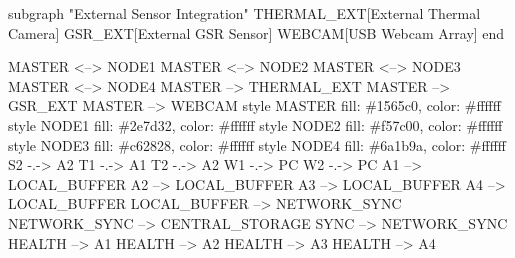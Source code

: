 \documentclass[11pt,a4paper]{report}
\begin{document}
    subgraph "External Sensor Integration"
        THERMAL\_EXT[External Thermal Camera]
        GSR\_EXT[External GSR Sensor]
        WEBCAM[USB Webcam Array]
    end

    MASTER <--> NODE1
    MASTER <--> NODE2
    MASTER <--> NODE3
    MASTER <--> NODE4
    MASTER --> THERMAL\_EXT
    MASTER --> GSR\_EXT
    MASTER --> WEBCAM
    style MASTER fill: \#1565c0, color: \#ffffff
    style NODE1 fill: \#2e7d32, color: \#ffffff
    style NODE2 fill: \#f57c00, color: \#ffffff
    style NODE3 fill: \#c62828, color: \#ffffff
    style NODE4 fill: \#6a1b9a, color: \#ffffff
    S2 -.-> A2
    T1 -.-> A1
    T2 -.-> A2
    W1 -.-> PC
    W2 -.-> PC
    A1 --> LOCAL\_BUFFER
    A2 --> LOCAL\_BUFFER
    A3 --> LOCAL\_BUFFER
    A4 --> LOCAL\_BUFFER
    LOCAL\_BUFFER --> NETWORK\_SYNC
    NETWORK\_SYNC --> CENTRAL\_STORAGE
    SYNC --> NETWORK\_SYNC
    HEALTH --> A1
    HEALTH --> A2
    HEALTH --> A3
    HEALTH --> A4
\end{document}
